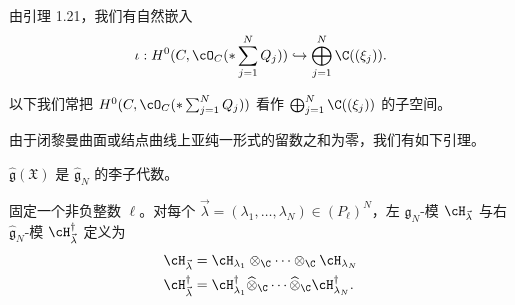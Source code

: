 由引理 1.21，我们有自然嵌入
\[
\iota:H^0(C,\cO_C(*\sum_{j=1}^{N}Q_j))\hookrightarrow\bigoplus_{j=1}^{N}\C((\xi_j)).
\]


以下我们常把 $H^0(C,\cO_C(*\sum_{j=1}^{N}Q_j))$ 看作 $\bigoplus_{j=1}^{N}\C((\xi_j))$ 的子空间。

由于闭黎曼曲面或结点曲线上亚纯一形式的留数之和为零，我们有如下引理。


\begin{lemma}[3.2]
$\hat{\mathfrak{g}}(\mathfrak{X})$ 是 $\hat{\mathfrak{g}}_N$ 的李子代数。
\end{lemma}


固定一个非负整数 $\ell$。对每个 $\vec{\lambda}=(\lambda_1,\dots,\lambda_N)\in(P_\ell)^N$，左 $\hat{\mathfrak{g}}_N$-模 $\cH_{\vec{\lambda}}$ 与右 $\hat{\mathfrak{g}}_N$-模 $\cH^{\dagger}_{\vec{\lambda}}$ 定义为
\[
\begin{aligned}
\cH_{\vec{\lambda}}&=\cH_{\lambda_1}\otimes_{\C}\cdots\otimes_{\C}\cH_{\lambda_N}\\
\cH^{\dagger}_{\vec{\lambda}}&=\cH^{\dagger}_{\lambda_1}\widehat{\otimes}_{\C}\cdots\widehat{\otimes}_{\C}\cH^{\dagger}_{\lambda_N}.
\end{aligned}
\]



